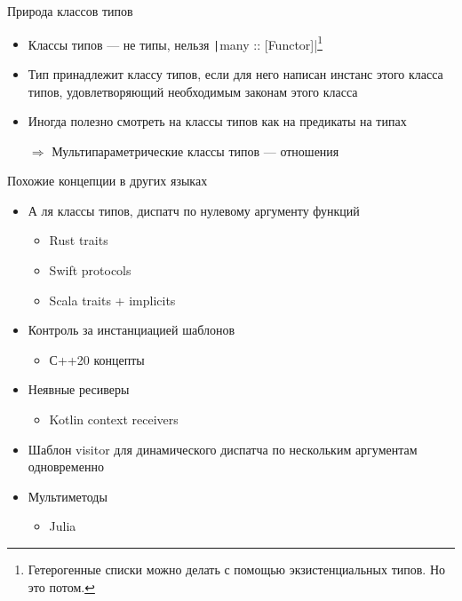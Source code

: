     \begin{frame}[fragile]{Природа классов типов}
        \begin{itemize}
            \item \pause Классы типов --- не типы, нельзя \texttt|many :: [Functor]|\footnote{Гетерогенные списки можно делать с помощью экзистенциальных типов. Но это потом.}
            \item \pause Тип принадлежит классу типов, если для него написан инстанс этого класса типов, удовлетворяющий необходимым законам этого класса
            \item \pause Иногда полезно смотреть на классы типов как на предикаты на типах
            \item[$\Rightarrow$] Мультипараметрические классы типов --- отношения
        \end{itemize}
    \end{frame}

    \begin{frame}[fragile]{Похожие концепции в других языках \popslide}
        \begin{itemize}
            \item А ля классы типов, диспатч по нулевому аргументу функций
            \begin{itemize}
                \item Rust traits
                \item Swift protocols
                \item Scala traits + implicits
            \end{itemize}
            \item Контроль за инстанциацией шаблонов
            \begin{itemize}
                \item С++20 концепты
            \end{itemize}
            \item Неявные ресиверы
            \begin{itemize}
                \item Kotlin context receivers
            \end{itemize}
            \item Шаблон visitor для динамического диспатча по нескольким аргументам одновременно
            \item Мультиметоды
            \begin{itemize}
                \item Julia
            \end{itemize}
        \end{itemize}
    \end{frame}

